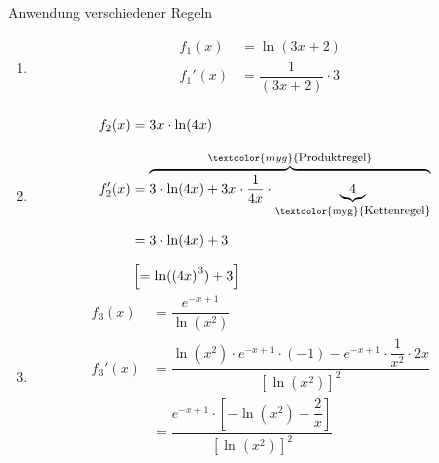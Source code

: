 \begin{Example}{Anwendung verschiedener Regeln}{}
    \begin{enumerate}[label=\alph*)]
        \item [a)] {
            \vspace{-3.0ex}
            \begin{align*}
                f_{1}(x) &= \ln\left(3x + 2\right) &&\\[2.0ex]
                f_{1}'(x) &= \dfrac{1}{\left(3x + 2\right)} \cdot 3 &&\\[-2.0ex]
            \end{align*}
            }
        \item [b)] {
            \vspace{-3.0ex}
            \begin{align*}
                f_{2}(x) &= 3x \cdot \ln(4x) &&\\[2.0ex]
                f_{2}'(x) &= \overbrace{3 \cdot \ln(4x) + 3x \cdot \dfrac{1}{4x} \cdot \underbrace{4}_{\text{\textcolor{myg}{\footnotesize Kettenregel}}}}^{\textcolor{myg}{\text{\footnotesize Produktregel}}} &&\\[1.5ex]
                &= 3 \cdot \ln(4x) + 3 && \\[1.5ex]
                &\left[= \ln(\left(4x\right)^3) + 3 \right]&&\\[-2.0ex]
            \end{align*}
            }
        \item [c)] {
            \vspace{-3.0ex}
            \begin{align*}
                f_{3}(x) &= \dfrac{e^{-x+1}}{\ln(x^2)} &&\\[2.0ex]
                f_{3}'(x) &= \dfrac{\ln(x^2) \cdot e^{-x+1} \cdot (-1) - e^{-x+1} \cdot \dfrac{1}{x^2} \cdot 2x}{\left[\ln(x^2)\right]^2} && \\[2.0ex]
                &= \dfrac{e^{-x+1} \cdot \left[-\ln(x^2) - \dfrac{2}{x}\right]}{\left[\ln(x^2)\right]^2} &&\\[-2.0ex]
            \end{align*}
            }
    \end{enumerate}
\end{Example}